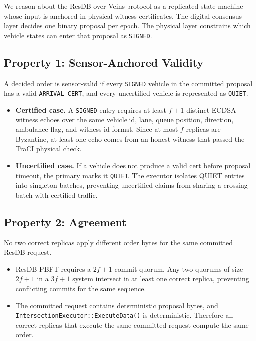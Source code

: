 \documentclass[fleqn,10pt]{olplainarticle}
\begin{document}
We reason about the ResDB-over-Veins protocol as a replicated state machine whose input is anchored in physical witness certificates. The digital consensus layer decides one binary proposal per epoch. The physical layer constrains which vehicle states can enter that proposal as \texttt{SIGNED}.

\subsection{Property 1: Sensor-Anchored Validity}

A decided order is sensor-valid if every \texttt{SIGNED} vehicle in the committed proposal has a valid \texttt{ARRIVAL\_CERT}, and every uncertified vehicle is represented as \texttt{QUIET}.

\begin{itemize}
    \item \textbf{Certified case.} A \texttt{SIGNED} entry requires at least $f+1$ distinct ECDSA witness echoes over the same vehicle id, lane, queue position, direction, ambulance flag, and witness id format. Since at most $f$ replicas are Byzantine, at least one echo comes from an honest witness that passed the TraCI physical check.
    \item \textbf{Uncertified case.} If a vehicle does not produce a valid cert before proposal timeout, the primary marks it \texttt{QUIET}. The executor isolates QUIET entries into singleton batches, preventing uncertified claims from sharing a crossing batch with certified traffic.
\end{itemize}

\subsection{Property 2: Agreement}

No two correct replicas apply different order bytes for the same committed ResDB request.

\begin{itemize}
    \item ResDB PBFT requires a $2f+1$ commit quorum. Any two quorums of size $2f+1$ in a $3f+1$ system intersect in at least one correct replica, preventing conflicting commits for the same sequence.
    \item The committed request contains deterministic proposal bytes, and \texttt{IntersectionExecutor::ExecuteData()} is deterministic. Therefore all correct replicas that execute the same committed request compute the same order.
\end{itemize}
\end{document}
